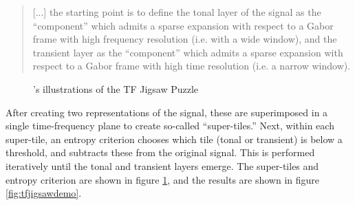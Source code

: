 \documentclass[letter,12pt]{article}
\begin{document}
\begin{quote}
	[...] the starting point is to define the tonal layer of the signal as the ``component'' which admits a sparse expansion with respect to a Gabor frame with high frequency resolution (i.e. with a wide window), and the transient layer as the ``component'' which admits a sparse expansion with respect to a Gabor frame with high time resolution (i.e. a narrow window).
\end{quote}

\begin{figure}[ht]
	\centering
	\hspace{1em}
	\caption{\citet{tfjigsaw}'s illustrations of the TF Jigsaw Puzzle}
	\label{fig:supertiles}
\end{figure}

After creating two representations of the signal, these are superimposed in a single time-frequency plane to create so-called ``super-tiles.'' Next, within each super-tile, an entropy criterion chooses which tile (tonal or transient) is below a threshold, and subtracts these from the original signal. This is performed iteratively until the tonal and transient layers emerge. The super-tiles and entropy criterion are shown in figure \ref{fig:supertiles}, and the results are shown in figure \ref{fig:tfjigsawdemo}.
\end{document}
